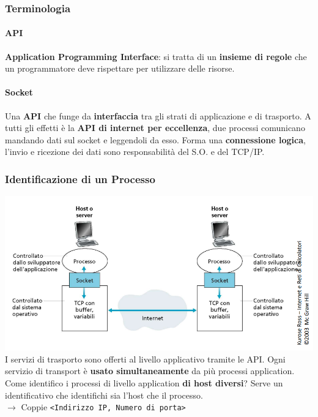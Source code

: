 \documentclass[10pt]{article}
\begin{document}
\subsubsection{Terminologia}
\paragraph{API} \textbf{Application Programming Interface}: si tratta di un \textbf{insieme di regole} che un programmatore deve rispettare per utilizzare delle risorse.
\paragraph{Socket} Una \textbf{API} che funge da \textbf{interfaccia} tra gli strati di applicazione e di trasporto. A tutti gli effetti è la \textbf{API di internet per eccellenza}, due processi comunicano mandando dati sul socket e leggendoli da esso. Forma una \textbf{connessione logica}, l'invio e ricezione dei dati sono responsabilità del S.O. e del TCP/IP.
\subsubsection{Identificazione di un Processo}
\includegraphics[scale=0.73]{identifprocesso.png}
I servizi di trasporto sono offerti al livello applicativo tramite le API. Ogni servizio di transport è \textbf{usato simultaneamente} da più processi application.\\
Come identifico i processi di livello application \textbf{di host diversi}? Serve un identificativo che identifichi sia l'host che il processo.\\
$\rightarrow$ Coppie \texttt{<Indirizzo IP, Numero di porta>}
\begin{center}
\end{center}
\end{document}
